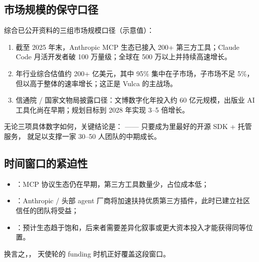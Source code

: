 \subsection{市场规模的保守口径}

综合已公开资料的三组市场规模口径（示意值）：

\begin{enumerate}
  \item {}\quad 截至 2025 年末，Anthropic MCP 生态已接入 200+ 第三方工具；Claude Code 月活开发者破 100 万量级；全球在 500 万以上并持续高速增长。
  \item {} 年行业综合估值约 200+ 亿美元，其中 95\% 集中在子市场，子市场不足 5\%，但以高于整体的速率增长；这正是 Vulca 的主战场。
  \item {}\quad 信通院 / 国家文物局披露口径：文博数字化年投入约 60 亿元规模，出版业 AI 工具化尚在早期；规划目标到 2028 年实现 3–5 倍增长。
\end{enumerate}


无论三项具体数字如何，关键结论是：
——
只要成为里最好的开源 SDK + 托管服务，
就足以支撑一家 30–50 人团队的中期成长。

\subsection{时间窗口的紧迫性}

\begin{itemize}
  \item {}：MCP 协议生态仍在早期，第三方工具数量少，占位成本低；
  \item {}：Anthropic / 头部 agent 厂商将加速扶持优质第三方插件，此时已建立社区信任的团队将受益；
  \item {}：预计生态趋于饱和，后来者需要差异化叙事或更大资本投入才能获得同等位置。
\end{itemize}

换言之，，
天使轮的 funding 时机正好覆盖这段窗口。
